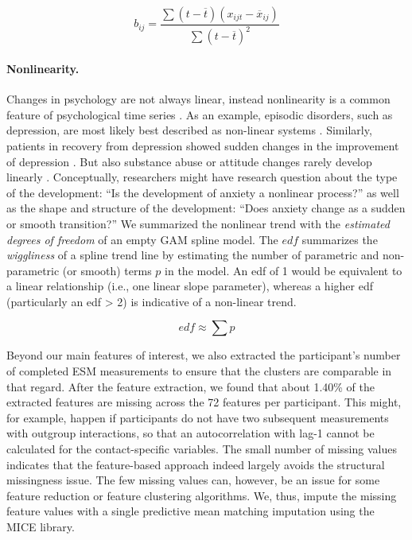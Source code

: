 \begin{equation} \label{eq:lin}
  b_{ij} = \frac{\sum(t-\overline{t})(x_{ijt}-\overline{x}_{ij})}{\sum(t-\overline{t})^2}
\end{equation}

\paragraph{Nonlinearity.}

Changes in psychology are not always linear, instead nonlinearity is a
common feature of psychological time series \citep{hayes2007}. As an
example, episodic disorders, such as depression, are most likely best
described as non-linear systems \citep{hosenfeld2015}. Similarly,
patients in recovery from depression showed sudden changes in the
improvement of depression \citep{helmich2020a}. But also substance abuse
\citep{boker1998} or attitude changes rarely develop linearly
\citep{vandermaas2003}. Conceptually, researchers might have research
question about the type of the development: ``Is the development of
anxiety a nonlinear process?'' as well as the shape and structure of the
development: ``Does anxiety change as a sudden or smooth transition?''
We summarized the nonlinear trend with the
\textit{estimated degrees of freedom} of an empty GAM spline model. The
\(edf\) summarizes the \textit{wiggliness} of a spline trend line by
estimating the number of parametric and non-parametric (or smooth) terms
\(p\) in the model. An edf of 1 would be equivalent to a linear
relationship (i.e., one linear slope parameter), whereas a higher edf
(particularly an edf \textgreater{} 2) is indicative of a non-linear
trend.

\begin{equation} \label{eq:edf}
  edf \approx \sum p
\end{equation}

Beyond our main features of interest, we also extracted the
participant's number of completed ESM measurements to ensure that the
clusters are comparable in that regard. After the feature extraction, we
found that about 1.40\% of the extracted features are missing across the
72 features per participant. This might, for example, happen if
participants do not have two subsequent measurements with outgroup
interactions, so that an autocorrelation with lag-1 cannot be calculated
for the contact-specific variables. The small number of missing values
indicates that the feature-based approach indeed largely avoids the
structural missingness issue. The few missing values can, however, be an
issue for some feature reduction or feature clustering algorithms. We,
thus, impute the missing feature values with a single predictive mean
matching imputation using the MICE library.
